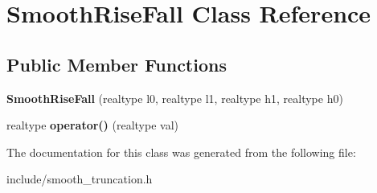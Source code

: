 \hypertarget{classSmoothRiseFall}{\section{Smooth\+Rise\+Fall Class Reference}
\label{classSmoothRiseFall}
}
\subsection*{Public Member Functions}
\begin{DoxyCompactItemize}
\item 
\hypertarget{classSmoothRiseFall_a5ee000a0ceb6c1d273fb4db094fa376c}{{\bfseries Smooth\+Rise\+Fall} (realtype l0, realtype l1, realtype h1, realtype h0)}\label{classSmoothRiseFall_a5ee000a0ceb6c1d273fb4db094fa376c}

\item 
\hypertarget{classSmoothRiseFall_a4a2e9061daea272ad7c5de01d8205cb6}{realtype {\bfseries operator()} (realtype val)}\label{classSmoothRiseFall_a4a2e9061daea272ad7c5de01d8205cb6}

\end{DoxyCompactItemize}


The documentation for this class was generated from the following file\+:\begin{DoxyCompactItemize}
\item 
include/smooth\+\_\+truncation.\+h\end{DoxyCompactItemize}
